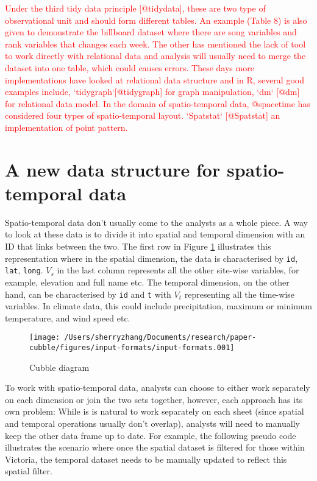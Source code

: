 \documentclass{article}
\begin{document}
\textcolor{red}{Under the third tidy data principle [@tidydata], these are two type of observational unit and should form different tables. An example (Table 8) is also given to demonstrate the billboard dataset where there are song variables and rank variables that changes each week. The other has mentioned the lack of tool to work directly with relational data and analysis will usually need to merge the dataset into one table, which could causes errors. These days more implementations have looked at relational data structure and in R, several good examples include, `tidygraph`[@tidygraph] for graph manipulation, `dm` [@dm] for relational data model. In the domain of spatio-temporal data, @spacetime has considered four types of spatio-temporal layout. `Spatstat` [@Spatstat] an implementation of point pattern.  }

\newpage

\hypertarget{a-new-data-structure-for-spatio-temporal-data}{%
\section{A new data structure for spatio-temporal
data}\label{a-new-data-structure-for-spatio-temporal-data}}

Spatio-temporal data don't usually come to the analysts as a whole
piece. A way to look at these data is to divide it into spatial and
temporal dimension with an ID that links between the two. The first row
in Figure \ref{fig:cubble-diagram} illustrates this representation where
in the spatial dimension, the data is characterised by \texttt{id},
\texttt{lat}, \texttt{long}. \(V_s\) in the last column represents all
the other site-wise variables, for example, elevation and full name etc.
The temporal dimension, on the other hand, can be characterised by
\texttt{id} and \texttt{t} with \(V_t\) representing all the time-wise
variables. In climate data, this could include precipitation, maximum or
minimum temperature, and wind speed etc.

\begin{figure}

{\centering \texttt{[image: /Users/sherryzhang/Documents/research/paper-cubble/figures/input-formats/input-formats.001]} 

}

\caption{Cubble diagram}\label{fig:cubble-diagram}
\end{figure}

To work with spatio-temporal data, analysts can choose to either work
separately on each dimension or join the two sets together, however,
each approach has its own problem: While is is natural to work
separately on each sheet (since spatial and temporal operations usually
don't overlap), analysts will need to manually keep the other data frame
up to date. For example, the following pseudo code illustrates the
scenario where once the spatial dataset is filtered for those within
Victoria, the temporal dataset needs to be manually updated to reflect
this spatial filter.
\end{document}
